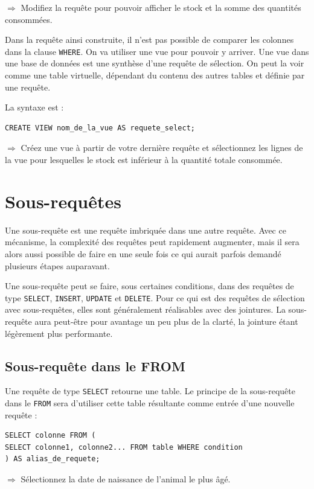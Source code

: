 \documentclass[11pt]{article}
\newcommand{\action}{$\Rightarrow$ }
\begin{document}
\action Modifiez la requête pour pouvoir afficher le stock et la somme des quantités consommées.

Dans la requête ainsi construite, il n'est pas possible de comparer les colonnes dans la clause \lstinline{WHERE}. On va utiliser une vue pour pouvoir y arriver. Une vue dans une base de données est une synthèse d'une requête de sélection. On peut la voir comme une table virtuelle, dépendant du contenu des autres tables et définie par une requête.

La syntaxe est :
\begin{lstlisting}
CREATE VIEW nom_de_la_vue AS requete_select;
\end{lstlisting}

\action Créez une vue à partir de votre dernière requête et sélectionnez les lignes de la vue pour lesquelles le stock est inférieur à la quantité totale consommée.


\section{Sous-requêtes}
Une sous-requête est une requête imbriquée dans une autre requête. Avec ce mécanisme, la complexité des requêtes peut rapidement augmenter, mais il sera alors aussi possible de faire en une seule fois ce qui aurait parfois demandé plusieurs étapes auparavant. 

Une sous-requête peut se faire, sous certaines conditions, dans des requêtes de type \lstinline{SELECT}, \lstinline{INSERT}, \lstinline{UPDATE} et \lstinline{DELETE}. Pour ce qui est des requêtes de sélection avec sous-requêtes, elles sont généralement réalisables avec des jointures. La sous-requête aura peut-être pour avantage un peu plus de la clarté, la jointure étant légèrement plus performante.

\subsection{Sous-requête dans le FROM}
Une requête de type \lstinline{SELECT} retourne une table. Le principe de la sous-requête dans le \lstinline{FROM} sera d'utiliser cette table résultante comme entrée d'une nouvelle requête :
\begin{lstlisting}
SELECT colonne FROM (
SELECT colonne1, colonne2... FROM table WHERE condition
) AS alias_de_requete;
\end{lstlisting}

\action Sélectionnez la date de naissance de l'animal le plus âgé.
\end{document}
